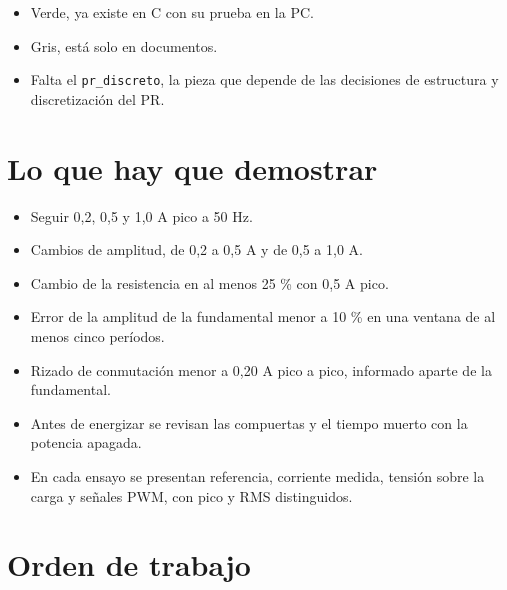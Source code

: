 \documentclass[11pt,a4paper]{article}
\begin{document}
\begin{itemize}
\item Verde, ya existe en C con su prueba en la PC.
\item Gris, está solo en documentos.
\item Falta el \texttt{pr\_discreto}, la pieza que depende de las decisiones de estructura y discretización del PR.
\end{itemize}

\section{Lo que hay que demostrar}

\begin{itemize}
\item Seguir 0,2, 0,5 y 1,0 A pico a 50 Hz.
\item Cambios de amplitud, de 0,2 a 0,5 A y de 0,5 a 1,0 A.
\item Cambio de la resistencia en al menos 25 \% con 0,5 A pico.
\item Error de la amplitud de la fundamental menor a 10 \% en una ventana de al menos cinco períodos.
\item Rizado de conmutación menor a 0,20 A pico a pico, informado aparte de la fundamental.
\item Antes de energizar se revisan las compuertas y el tiempo muerto con la potencia apagada.
\item En cada ensayo se presentan referencia, corriente medida, tensión sobre la carga y señales PWM, con pico y RMS distinguidos.
\end{itemize}


\section{Orden de trabajo}

\begin{center}
\end{center}
\end{document}
